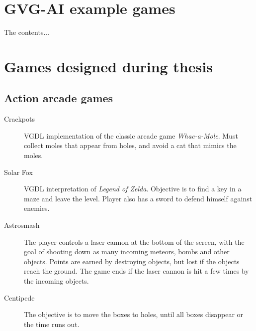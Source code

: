 \documentclass[a4paper,titlepage,final, twoside]{report}
\begin{document}



\begin{appendices}



\chapter{GVG-AI example games}
The contents...


\chapter{Games designed during thesis}
\label{app_thesisgame}

\section{Action arcade games}

\begin{description}
\item [Crackpots] \citeyearpar{game:crackpots} VGDL implementation of the classic arcade game \emph{Whac-a-Mole}. Must collect moles that appear from holes, and avoid a cat that mimics the moles.
\item [Solar Fox] VGDL interpretation of \emph{Legend of Zelda}. Objective is to find a key in a maze and leave the level. Player also has a sword to defend himself against enemies.
\item [Astrosmash]  \citeyearpar{game:astrosmash} The player controls a laser cannon at the bottom of the screen, with the goal of shooting down as many incoming meteors, bombs and other objects. Points are earned by destroying objects, but lost if the objects reach the ground.
The game ends if the laser cannon is hit a few times  by the incoming objects.
\item [Centipede] The objective is to move the boxes to holes, until all boxes disappear or the time runs out.
\end{description}


\end{appendices}
\end{document}
